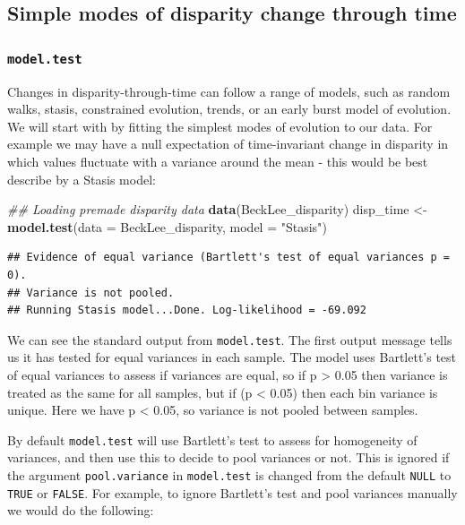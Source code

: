 \documentclass[]{book}
\newenvironment{Shaded}{\begin{snugshade}}{\end{snugshade}}
\newcommand{\CommentTok}[1]{\textcolor[rgb]{0.56,0.35,0.01}{\textit{#1}}}
\newcommand{\DataTypeTok}[1]{\textcolor[rgb]{0.13,0.29,0.53}{#1}}
\newcommand{\KeywordTok}[1]{\textcolor[rgb]{0.13,0.29,0.53}{\textbf{#1}}}
\newcommand{\NormalTok}[1]{#1}
\newcommand{\StringTok}[1]{\textcolor[rgb]{0.31,0.60,0.02}{#1}}
\begin{document}
\hypertarget{simple-modes-of-disparity-change-through-time}{%
\subsection{Simple modes of disparity change through time}\label{simple-modes-of-disparity-change-through-time}}

\hypertarget{model.test}{%
\subsubsection{\texorpdfstring{\texttt{model.test}}{model.test}}\label{model.test}}

Changes in disparity-through-time can follow a range of models, such as random walks, stasis, constrained evolution, trends, or an early burst model of evolution.
We will start with by fitting the simplest modes of evolution to our data.
For example we may have a null expectation of time-invariant change in disparity in which values fluctuate with a variance around the mean - this would be best describe by a Stasis model:

\begin{Shaded}
\begin{Highlighting}[]
\CommentTok{## Loading premade disparity data}
\KeywordTok{data}\NormalTok{(BeckLee_disparity)}
\NormalTok{disp_time <-}\StringTok{ }\KeywordTok{model.test}\NormalTok{(}\DataTypeTok{data =}\NormalTok{ BeckLee_disparity, }\DataTypeTok{model =} \StringTok{"Stasis"}\NormalTok{)}
\end{Highlighting}
\end{Shaded}

\begin{verbatim}
## Evidence of equal variance (Bartlett's test of equal variances p = 0).
## Variance is not pooled.
## Running Stasis model...Done. Log-likelihood = -69.092
\end{verbatim}

We can see the standard output from \texttt{model.test}.
The first output message tells us it has tested for equal variances in each sample.
The model uses Bartlett's test of equal variances to assess if variances are equal, so if p \textgreater{} 0.05 then variance is treated as the same for all samples, but if (p \textless{} 0.05) then each bin variance is unique.
Here we have p \textless{} 0.05, so variance is not pooled between samples.

By default \texttt{model.test} will use Bartlett's test to assess for homogeneity of variances, and then use this to decide to pool variances or not.
This is ignored if the argument \texttt{pool.variance} in \texttt{model.test} is changed from the default \texttt{NULL} to \texttt{TRUE} or \texttt{FALSE}.
For example, to ignore Bartlett's test and pool variances manually we would do the following:
\end{document}
